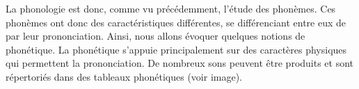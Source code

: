 \documentclass[12pt, french, twoside]{report}
\begin{document}
La phonologie est donc, comme vu précédemment, l'étude des phonèmes. Ces phonèmes ont donc des caractéristiques différentes, se différenciant entre eux de par leur prononciation. 
Ainsi, nous allons évoquer quelques notions de phonétique. La phonétique s'appuie principalement sur des caractères physiques qui permettent la prononciation. De nombreux sons peuvent être produits et sont répertoriés dans des tableaux phonétiques \citep{Saussure} (voir image). 
\end{document}
